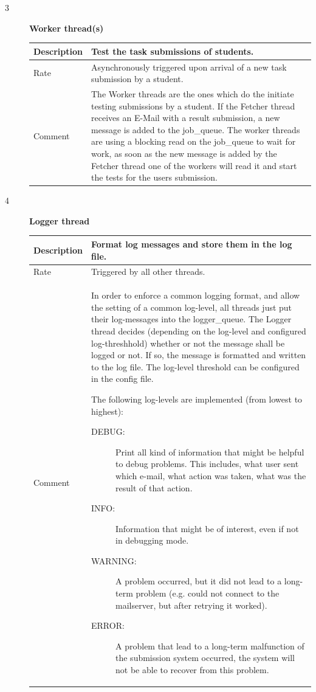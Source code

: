 \begin{description}
	\item [3] \textbf{Worker thread(s)} \\
    \begin{tabular}{|p{2cm}|p{11cm}|}
        \hline
        Description & Test the task submissions of students. \\
        \hline
        Rate & Asynchronously triggered upon arrival of a new task submission 
		by a student. \\
        \hline
        Comment & The Worker threads are the ones which do the initiate testing 
		submissions by a student. If the Fetcher thread receives an E-Mail with a result 
		submission, a new message is added to the job\_queue. The worker threads are 
		using a blocking read on the job\_queue to wait for work, as soon as the new 
		message is added by the Fetcher thread one of the workers will read it and 
		start the tests for the users submission.
        \\
        \hline
    \end{tabular}

    
	\item [4] \textbf{Logger thread}\label{sec:logger} \\
    \begin{tabular}{|p{2cm}|p{11cm}|}
        \hline
        Description & Format log messages and store them in the log file. \\
        \hline
        Rate & Triggered by all other threads. \\
        \hline
		Comment & In order to enforce a common logging format, and allow the setting 
		of a common log-level, all threads just put their log-messages into the 
		logger\_queue. The Logger thread decides (depending on the log-level and configured 
		log-threshhold) whether or not the message shall be logged or not. If so, the message
		is formatted and written to the log file. The log-level threshold can be configured in the
		config file.

		The following log-levels are implemented (from lowest to highest):
        \begin{description}
		\item [DEBUG:] Print all kind of information that might be helpful to debug
			problems. This includes, what user sent which e-mail, what action
			was taken, what was the result of that action.
		\item [INFO:] Information that might be of interest, even if not in debugging
			mode.
		\item [WARNING:] A problem occurred, but it did not lead to a long-term problem
			(e.g. could not connect to the mailserver, but after retrying it worked).
		\item [ERROR:] A problem that lead to a long-term malfunction of the submission
			system occurred, the system will not be able to recover from this problem.
		\end{description}
        \\
        \hline
    \end{tabular}


\end{description}

